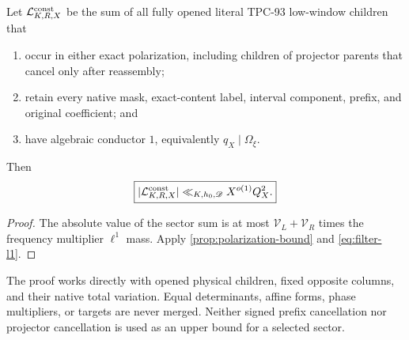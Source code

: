 \begin{theorem}
\label{thm:literal-constant-bound}
Let \(\mathcal L^{\rm const}_{K,R,X}\) be the sum of all fully opened
literal TPC-93 low-window children that
\begin{enumerate}[label=\textup{(\roman*)}]
\item occur in either exact polarization, including children of
  projector parents that cancel only after reassembly;
\item retain every native mask, exact-content label, interval
  component, prefix, and original coefficient; and
\item have algebraic conductor \(1\), equivalently
  \(q_X\mid\Omega_\xi\).
\end{enumerate}
Then
\begin{equation}
 \boxed{
 |\mathcal L^{\rm const}_{K,R,X}|
 \ll_{K,h_0,\mathscr D}
 X^{o(1)}Q_X^2.}
\label{eq:main-constant-bound}
\end{equation}
\end{theorem}

\begin{proof}
The absolute value of the sector sum is at most
\(\mathcal V_L+\mathcal V_R\) times the frequency multiplier
\(\ell^1\) mass.  Apply
\cref{prop:polarization-bound} and \eqref{eq:filter-l1}.
\end{proof}

\begin{remark}
The proof works directly with opened physical children, fixed
opposite columns, and their native total variation.  Equal
determinants, affine forms, phase multipliers, or targets are never
merged.  Neither signed prefix cancellation nor projector
cancellation is used as an upper bound for a selected sector.
\end{remark}
